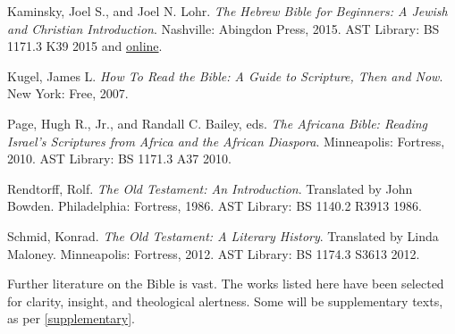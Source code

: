 \documentclass[titlepage]{article}
\begin{document}
\begin{thebibliography}{99}
	 Kaminsky, Joel S., and Joel N. Lohr.
	\emph{The Hebrew Bible for Beginners: A Jewish and Christian Introduction}.
	Nashville: Abingdon Press, 2015.
	AST Library: BS 1171.3 K39 2015 and \href{https://search.ebscohost.com/login.aspx?direct=true&AuthType=cookie,ip,shib&db=nlebk&AN=969753&site=ehost-live&scope=site&custid=s5315951}{online}.

	 Kugel, James L.
	\emph{How To Read the Bible: A Guide to Scripture, Then and Now}.
	New York: Free, 2007.

	 Page, Hugh R., Jr., and Randall C. Bailey, eds.
	\emph{The Africana Bible: Reading Israel’s Scriptures from Africa and the African Diaspora}.
	Minneapolis: Fortress, 2010.
	AST Library: BS 1171.3 A37 2010.

	 Rendtorff, Rolf.
	\emph{The Old Testament: An Introduction}. Translated by John Bowden.
	Philadelphia: Fortress, 1986.
	AST Library: BS 1140.2 R3913 1986.

	 Schmid, Konrad.
	\emph{The Old Testament: A Literary History}. Translated by Linda Maloney.
	Minneapolis: Fortress, 2012.
	AST Library: BS 1174.3 S3613 2012.

\end{thebibliography}
\endgroup


Further literature on the Bible is vast. The works listed here have been
selected for clarity, insight, and theological alertness. Some will be
supplementary texts, as per \autoref{supplementary}.
\end{document}
